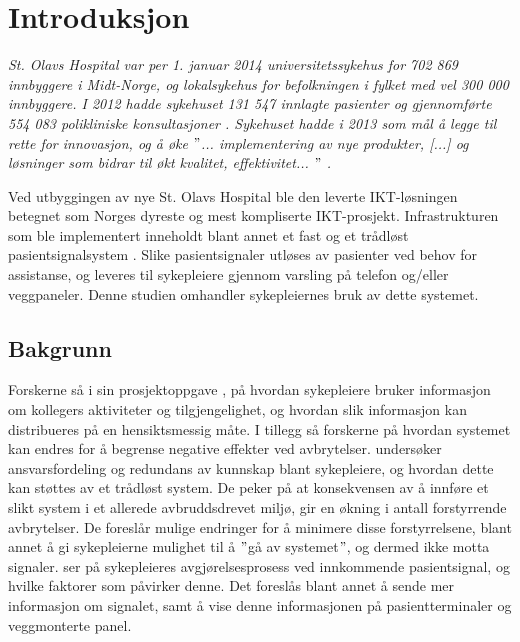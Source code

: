 \chapter{Introduksjon}
\label{chp:introduksjon}

\textit{St. Olavs Hospital var per 1. januar 2014 universitetssykehus for 702 869 innbyggere i Midt-Norge, og lokalsykehus for befolkningen i fylket med vel 300 000 innbyggere. I 2012 hadde sykehuset 131 547 innlagte pasienter og gjennomførte 554 083 polikliniske konsultasjoner \citep{stolavs}. Sykehuset hadde i 2013 som mål å legge til rette for innovasjon, og å øke $"$... implementering av nye produkter, [...] og løsninger som bidrar til økt kvalitet, effektivitet... $"$ \citep{styring13}.}

\noindent
Ved utbyggingen av nye St. Olavs Hospital ble den leverte IKT-løsningen betegnet som Norges dyreste og mest kompliserte IKT-prosjekt. Infrastrukturen som ble implementert inneholdt blant annet et fast og et trådløst pasientsignalsystem \citep{TU}. Slike pasientsignaler utløses av pasienter ved behov for assistanse, og leveres til sykepleiere gjennom varsling på telefon og/eller veggpaneler. Denne studien omhandler sykepleiernes bruk av dette systemet.  

\section{Bakgrunn}
Forskerne så i sin prosjektoppgave \citep{Sund13}, på hvordan sykepleiere bruker informasjon om kollegers aktiviteter og tilgjengelighet, og hvordan slik informasjon kan distribueres på en hensiktsmessig måte. I tillegg så forskerne på hvordan systemet kan endres for å begrense negative effekter ved avbrytelser. \citet{KlemetsRedundancy} undersøker ansvarsfordeling og redundans av kunnskap blant sykepleiere, og hvordan dette kan støttes av et trådløst system. De peker på at konsekvensen av å innføre et slikt system i et allerede avbruddsdrevet miljø, gir en økning i antall forstyrrende avbrytelser. De foreslår mulige endringer for å minimere disse forstyrrelsene, blant annet å gi sykepleierne mulighet til å $"$gå av systemet$"$, og dermed ikke motta signaler. \citep{klemets13} ser på sykepleieres avgjørelsesprosess ved innkommende pasientsignal, og hvilke faktorer som påvirker denne. Det foreslås blant annet å sende mer informasjon om signalet, samt å vise denne informasjonen på pasientterminaler og veggmonterte panel.

